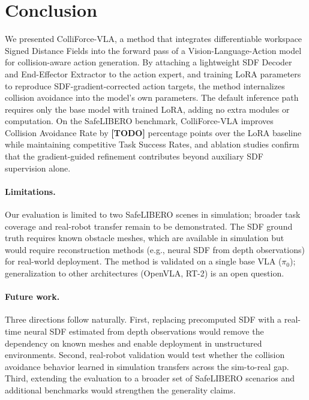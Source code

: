 \section{Conclusion}\label{sec:conclusion}

We presented ColliForce-VLA, a method that integrates differentiable workspace Signed Distance Fields into the forward pass of a Vision-Language-Action model for collision-aware action generation. By attaching a lightweight SDF Decoder and End-Effector Extractor to the action expert, and training LoRA parameters to reproduce SDF-gradient-corrected action targets, the method internalizes collision avoidance into the model's own parameters. The default inference path requires only the base model with trained LoRA, adding no extra modules or computation. On the SafeLIBERO benchmark, ColliForce-VLA improves Collision Avoidance Rate by \textbf{[TODO]} percentage points over the LoRA baseline while maintaining competitive Task Success Rates, and ablation studies confirm that the gradient-guided refinement contributes beyond auxiliary SDF supervision alone.

\paragraph{Limitations.} Our evaluation is limited to two SafeLIBERO scenes in simulation; broader task coverage and real-robot transfer remain to be demonstrated. The SDF ground truth requires known obstacle meshes, which are available in simulation but would require reconstruction methods (e.g., neural SDF from depth observations) for real-world deployment. The method is validated on a single base VLA ($\pi_0$); generalization to other architectures (OpenVLA, RT-2) is an open question.

\paragraph{Future work.} Three directions follow naturally. First, replacing precomputed SDF with a real-time neural SDF estimated from depth observations would remove the dependency on known meshes and enable deployment in unstructured environments. Second, real-robot validation would test whether the collision avoidance behavior learned in simulation transfers across the sim-to-real gap. Third, extending the evaluation to a broader set of SafeLIBERO scenarios and additional benchmarks would strengthen the generality claims.